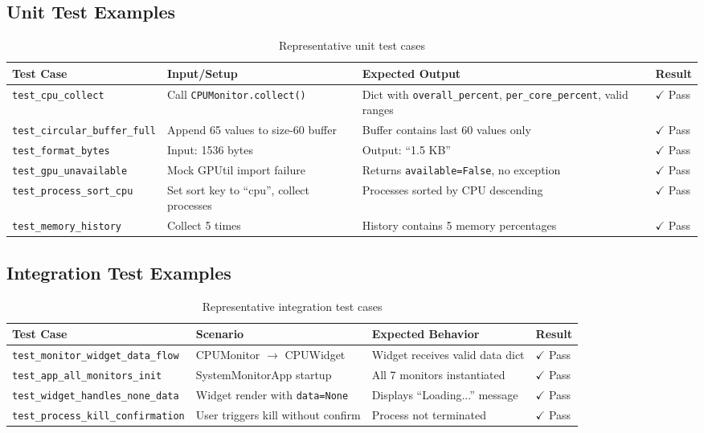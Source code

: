 \documentclass[12pt,a4paper,oneside]{report}
\begin{document}
\subsection{Unit Test Examples}

\begin{table}[h]
\centering
\caption{Representative unit test cases}
\label{tab:unit-tests}
\small
\begin{tabular}{|p{3cm}|p{4cm}|p{3.5cm}|p{2cm}|}
\hline
\textbf{Test Case} & \textbf{Input/Setup} & \textbf{Expected Output} & \textbf{Result} \\
\hline
\texttt{test\_cpu\_collect} & Call \texttt{CPUMonitor.collect()} & Dict with \texttt{overall\_percent}, \texttt{per\_core\_percent}, valid ranges & $\checkmark$ Pass \\
\hline
\texttt{test\_circular\_buffer\_full} & Append 65 values to size-60 buffer & Buffer contains last 60 values only & $\checkmark$ Pass \\
\hline
\texttt{test\_format\_bytes} & Input: 1536 bytes & Output: ``1.5 KB'' & $\checkmark$ Pass \\
\hline
\texttt{test\_gpu\_unavailable} & Mock GPUtil import failure & Returns \texttt{available=False}, no exception & $\checkmark$ Pass \\
\hline
\texttt{test\_process\_sort\_cpu} & Set sort key to ``cpu'', collect processes & Processes sorted by CPU descending & $\checkmark$ Pass \\
\hline
\texttt{test\_memory\_history} & Collect 5 times & History contains 5 memory percentages & $\checkmark$ Pass \\
\hline
\end{tabular}
\end{table}

\subsection{Integration Test Examples}

\begin{table}[h]
\centering
\caption{Representative integration test cases}
\label{tab:integration-tests}
\small
\begin{tabular}{|p{3.5cm}|p{4cm}|p{3cm}|p{2cm}|}
\hline
\textbf{Test Case} & \textbf{Scenario} & \textbf{Expected Behavior} & \textbf{Result} \\
\hline
\texttt{test\_monitor\_widget\_data\_flow} & CPUMonitor $\rightarrow$ CPUWidget & Widget receives valid data dict & $\checkmark$ Pass \\
\hline
\texttt{test\_app\_all\_monitors\_init} & SystemMonitorApp startup & All 7 monitors instantiated & $\checkmark$ Pass \\
\hline
\texttt{test\_widget\_handles\_none\_data} & Widget render with \texttt{data=None} & Displays ``Loading...'' message & $\checkmark$ Pass \\
\hline
\texttt{test\_process\_kill\_confirmation} & User triggers kill without confirm & Process not terminated & $\checkmark$ Pass \\
\hline
\end{tabular}
\end{table}
\end{document}
